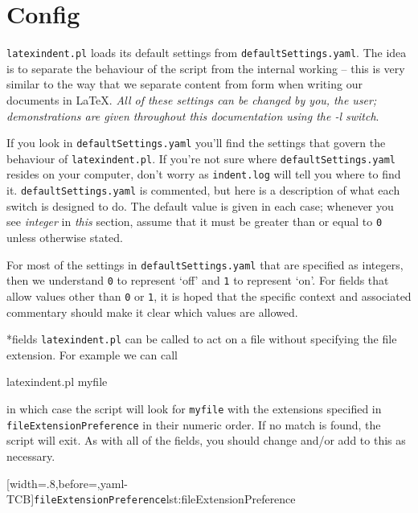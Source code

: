 \section{Config}\label{sec:defuseloc}
 \texttt{latexindent.pl} loads its default settings from \texttt{defaultSettings.yaml}. The idea
 is to separate the behaviour of the script from the internal working -- this is very
 similar to the way that we separate content from form when writing our documents in
 \LaTeX. \emph{All of these settings can be changed by you, the user; demonstrations
 are given throughout this documentation using the -l switch}.

 If you look in \texttt{defaultSettings.yaml} you'll find the settings that govern the
 behaviour of \texttt{latexindent.pl}. If you're not sure where
 \texttt{defaultSettings.yaml} resides on your computer, don't worry as
 \texttt{indent.log} will tell you where to find it. \texttt{defaultSettings.yaml} is
 commented, but here is a description of what each switch is designed to do. The default
 value is given in each case; whenever you see \emph{integer} in \emph{this} section,
 assume that it must be greater than or equal to \texttt{0} unless otherwise stated.

 For most of the settings in \texttt{defaultSettings.yaml} that are specified as
 integers, then we understand \texttt{0} to represent `off' and \texttt{1} to represent
 `on'. For fields that allow values other than \texttt{0} or \texttt{1}, it is hoped that
 the specific context and associated commentary should make it clear which values are
 allowed.

*{fields}
 \texttt{latexindent.pl} can be called to
 act on a file without specifying the file extension. For example we can call

 \begin{commandshell}
latexindent.pl myfile
\end{commandshell}

 in which case the script will look for \texttt{myfile} with the extensions specified in
 \texttt{fileExtensionPreference} in their numeric order. If no match is found, the
 script will exit. As with all of the fields, you should change and/or add to this as
 necessary.

 [width=.8\linewidth,before=\centering,yaml-TCB]{\texttt{fileExtensionPreference}}{lst:fileExtensionPreference}

